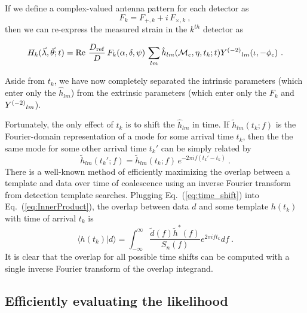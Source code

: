 If we define a complex-valued antenna pattern for each detector as
\begin{equation} \label{eq:complexF}
F_k = F_{+,k} + i \, F_{\times,k} \ ,
\end{equation}
then we can re-express the measured strain in the $k^{th}$ detector as
\begin{widetext}
\begin{equation} \label{eq:decomposed_strain}
H_k(\vec{\lambda},\vec{\theta};t) = {\rm Re}\ \frac{D_{\rm ref}}{D}\, F_k(\alpha,\delta,\psi) \, \sum_{lm} 
\hat{h}_{lm}({{\cal M}_c},\eta,t_k;t)  Y^{(-2)}{}_{lm}(\iota,-\phi_c)\ .
\end{equation}
\end{widetext}
Aside from $t_k$, we have now completely separated the intrinsic parameters (which enter only the $\hat{h}_{lm}$)
from the extrinsic parameters (which enter only the $F_k$ and $Y^{(-2)}{}_{lm}$). 

Fortunately, the only effect of $t_k$ is to shift the $\hat{h}_{lm}$ in time. 
If $\tilde{h}_{lm}(t_k;f)$ is the Fourier-domain representation of a mode for some arrival time $t_k$, then
the the same mode for some other arrival time $t_k'$ can be simply related by
\begin{equation} \label{eq:time_shift}
\tilde{h}_{lm}(t_k';f) = \tilde{h}_{lm}(t_k;f) \, e^{- 2 \pi i f (t_k' - t_k)}\ .
\end{equation}
There is a well-known method of efficiently maximizing the overlap between a template and data 
over time of coalescence using an inverse Fourier transform from detection template searches.
Plugging Eq.~(\ref{eq:time_shift}) into Eq.~(\ref{eq:InnerProduct}), the overlap between data $d$ and
some template $h(t_k)$ with time of arrival $t_k$ is
\begin{equation} \label{eq:IFFT}
\langle h(t_k) | d \rangle = \int_{-\infty}^{\infty} \frac{\tilde{d}(f) \tilde{h}^*(f)}{S_n(f)} e^{2\pi i f t_k} df \ .
\end{equation}
It is clear that the overlap for all possible time shifts can be computed with a single inverse Fourier transform
of the overlap integrand.

\subsection{Efficiently evaluating the likelihood}

